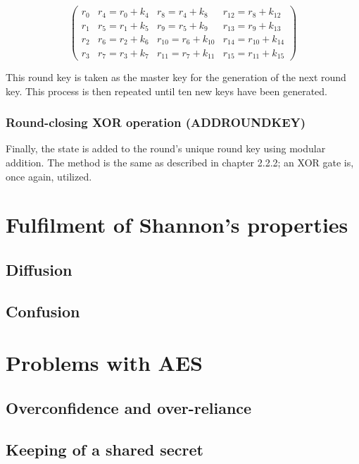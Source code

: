 \documentclass[12pt]{report}
\begin{document}
\[ \left( \begin{array}{cccc}
r_0 & r_4=r_0+k_4 & r_8=r_4+k_8 & r_{12}=r_8+k_{12} \\
r_1 & r_5=r_1+k_5 & r_9=r_5+k_9 & r_{13}=r_9+k_{13} \\
r_2 & r_6=r_2+k_6 & r_{10}=r_6+k_{10} & r_{14}=r_{10}+k_{14} \\
r_3 & r_7=r_3+k_7 & r_{11}=r_7+k_{11} & r_{15}=r_{11}+k_{15}\end{array} \right) \]

This round key is taken as the master key for the generation of the next round key. This process is then repeated until ten new keys have been generated.

\subsubsection{Round-closing XOR operation (ADDROUNDKEY)}
Finally, the state is added to the round's unique round key using modular addition. The method is the same as described in chapter 2.2.2; an XOR gate is, once again, utilized.

\section{Fulfilment of Shannon's properties}

\subsection{Diffusion}

\subsection{Confusion}

\section{Problems with AES}

\subsection{Overconfidence and over-reliance}

\subsection{Keeping of a shared secret}

\printbibliography
\end{document}
